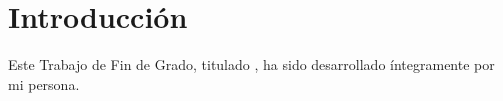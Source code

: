 \chapter*{Introducción}
Este Trabajo de Fin de Grado, titulado \textbf{\textit{\myTitle}}, ha sido desarrollado íntegramente por mi persona.
\newpage



